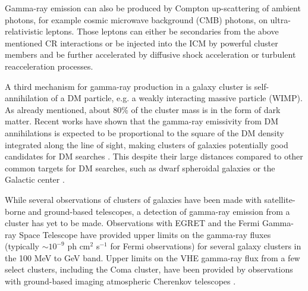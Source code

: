 \documentclass[12pt,manuscript]{aastex}
\begin{document}
Gamma-ray emission can also be produced by Compton up-scattering of ambient photons, for example cosmic microwave background (CMB) photons, on ultra-relativistic leptons. Those leptons can either be secondaries from the above mentioned CR interactions or be injected into the ICM by powerful cluster
members and be further accelerated by diffusive shock acceleration or turbulent reacceleration processes.

A third mechanism for gamma-ray production in a galaxy cluster is self-annihilation of a DM particle, e.g. a weakly interacting massive particle (WIMP). As already mentioned, about 80\% of the cluster mass is in the form of dark matter. Recent works \citep{article:EvansFerrerSarkar:2004, article:BergstromHooper:2006} have shown that the gamma-ray emissivity from DM annihilations is expected to be proportional to the square of the DM density integrated along the line of sight, making clusters of galaxies potentially good
candidates for DM searches \citep{article:PinzkePfrommerBergstrom2009, 2011ApJ...726L...6C}. This despite their large distances compared to other common targets for DM searches, such as dwarf spheroidal galaxies \citep{article:Strigari_etal:2007, article:Acciari_etal:2010,article:Aliu_etal:2009} or the Galactic center \citep{article:Kosack_etal:2004, article:Aharonian_etal:2006, article:Aharonian_etal:2009b}.

While several observations of clusters of galaxies have been made with satellite-borne and ground-based telescopes, a detection of gamma-ray emission from a cluster has yet to be made.  Observations with EGRET
\citep{article:Sreekumar_etal:1996, article:Reimer_etal:2003} and the Fermi Gamma-ray Space Telescope \citep{article:Ackermann_etal:2010} have provided upper limits on the gamma-ray fluxes (typically $\sim10^{-9}$ ph cm$^{2}$ s$^{-1}$ for Fermi observations) for several galaxy clusters in the 100 MeV to GeV
band. Upper limits on the VHE gamma-ray flux from a few select clusters, including the Coma cluster, have been provided by observations with ground-based imaging atmospheric Cherenkov telescopes \citep[IACTs;][]{article:Perkins_etal:2006, inproc:Perkins_etal:2008, article:Aharonian_etal:2009a, article:Aleksic_etal:2010}.
\end{document}
